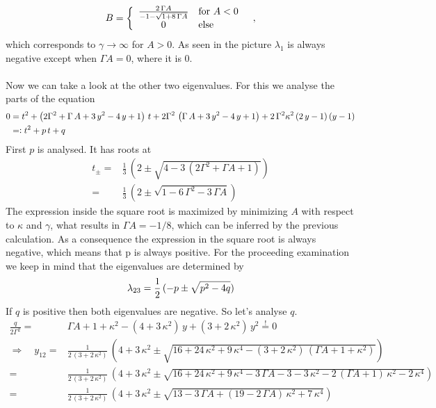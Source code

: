 \documentclass{article}
\begin{document}
\begin{align*}
    B=\bigg\{\begin{array}{c l}
          \frac{2\,\Gamma A}{-1-\sqrt{1+8\,\Gamma A}}&\text{for }A<0\\
         0&\text{else}
    \end{array}\quad,
\end{align*}
which corresponds to $\gamma\rightarrow\infty$ for $A>0$.
As seen in the picture $\lambda_1$ is always negative except when $\Gamma A=0$, where it is $0$.\\\\\newpage
Now we can take a look at the other two eigenvalues. For this we analyse the parts of the equation 
\begin{align*}
    0&=t^2+\left( 2\Gamma^2+\Gamma\,A+3\,y^2-4\,y+1  \right)\,t+2\Gamma^2\,\left( \Gamma\,A+3\,y^2-4\,y+1 \right)+2\,\Gamma^2\kappa^2\,(2\,y-1)\,(y-1)\\
    &=\vcentcolon t^2+p\,t+q
\end{align*}
First $p$ is analysed. It has roots at
\begin{align*}
    t_{\pm}=&\frac{1}{3}\,\left(  2\pm \sqrt{4-3\,(2\Gamma^2+\Gamma A + 1)} \right)\\
    =&\frac{1}{3}\,\left(  2\pm \sqrt{1-6\,\Gamma^2-3\,\Gamma A} \right)
\end{align*}
The expression inside the square root is maximized by minimizing $A$ with respect to $\kappa$ and $\gamma$, what results in $\Gamma A = -1/8$, which can be inferred by the previous calculation. As a consequence the expression in the square root is always negative, which means that p is always positive. For the proceeding examination we keep in mind that the eigenvalues are determined by
\begin{align*}
    \lambda_{23}=\frac{1}{2}\,(-p\pm\sqrt{p^2-4q})
\end{align*}
If $q$ is positive then both eigenvalues are negative. So let's analyse $q$. 
\begin{align*}
    \frac{q}{2\Gamma^2}=&\Gamma A +1 +\kappa^2-(4+3\,\kappa^2)\,y+(3+2\,\kappa^2)\,y^2\overset{!}{=}0\\
    \Rightarrow\quad y_{12}=&\frac{1}{2\,(3+2\,\kappa^2)}\,\left( 4+3\,\kappa^2\pm \sqrt{16+24\,\kappa^2+9\,\kappa^4-(3+2\,\kappa^2)\,(\Gamma A +1 +\kappa^2)}   \right)\\
    =&\frac{1}{2\,(3+2\,\kappa^2)}\,\left( 4+3\,\kappa^2\pm \sqrt{16+24\,\kappa^2+9\,\kappa^4 -3\,\Gamma A -3 -3\,\kappa^2-2\,(\Gamma A+1)\,\kappa^2-2\,\kappa^4}   \right)\\
    =&\frac{1}{2\,(3+2\,\kappa^2)}\,\left( 4+3\,\kappa^2\pm \sqrt{13-3\,\Gamma A+(19-2\,\Gamma A)\,\kappa^2+7\,\kappa^4}   \right)\\
\end{align*}
\end{document}
